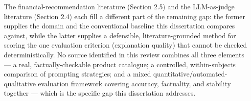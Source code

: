 The financial-recommendation literature (Section 2.5) and the LLM-as-judge literature (Section 2.4) each fill a different part of the remaining gap: the former supplies the domain and the conventional baseline this dissertation compares against, while the latter supplies a defensible, literature-grounded method for scoring the one evaluation criterion (explanation quality) that cannot be checked deterministically. No source identified in this review combines all three elements --- a real, factually-checkable product catalogue; a controlled, within-subjects comparison of prompting strategies; and a mixed quantitative/automated-qualitative evaluation framework covering accuracy, factuality, and stability together --- which is the specific gap this dissertation addresses.
